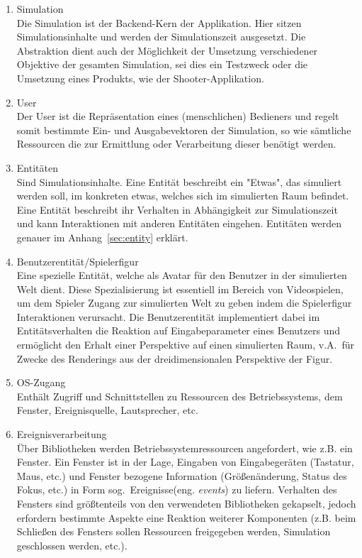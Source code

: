 \documentclass[11pt,twoside,a4paper]{article}
\begin{document}
\begin{enumerate}
\item Simulation\\
Die Simulation ist der Backend-Kern der Applikation. Hier sitzen Simulationsinhalte und werden der Simulationszeit ausgesetzt. Die Abstraktion dient auch der Möglichkeit der Umsetzung verschiedener Objektive der gesamten Simulation, sei dies ein Testzweck oder die Umsetzung eines Produkts, wie der Shooter-Applikation.
\item User\\
Der User ist die Repräsentation eines (menschlichen) Bedieners und regelt somit bestimmte Ein- und Ausgabevektoren der Simulation, so wie sämtliche Ressourcen die zur Ermittlung oder Verarbeitung dieser benötigt werden.
\item Entitäten\\
Sind Simulationsinhalte. Eine Entität beschreibt ein "Etwas", das simuliert werden soll, im konkreten etwas, welches sich im simulierten Raum befindet. Eine Entität beschreibt ihr Verhalten in Abhängigkeit zur Simulationszeit und kann Interaktionen mit anderen Entitäten eingehen. Entitäten werden genauer im Anhang~\ref{sec:entity} erklärt.
\item Benutzerentität/Spielerfigur\\
Eine spezielle Entität, welche als Avatar für den Benutzer in der simulierten Welt dient. Diese Spezialisierung ist essentiell im Bereich von Videospielen, um dem Spieler Zugang zur simulierten Welt zu geben indem die Spielerfigur Interaktionen verursacht. Die Benutzerentität implementiert dabei im Entitätsverhalten die Reaktion auf Eingabeparameter eines Benutzers und ermöglicht den Erhalt einer Perspektive auf einen simulierten Raum, v.A.~für Zwecke des Renderings aus der dreidimensionalen Perspektive der Figur.
\item OS-Zugang\\
Enthält Zugriff und Schnittstellen zu Ressourcen des Betriebssystems, dem Fenster, Ereignisquelle, Lautsprecher, etc.
\item Ereignisverarbeitung\\
Über Bibliotheken werden Betriebssystemressourcen angefordert, wie z.B. ein Fenster. Ein Fenster ist in der Lage, Eingaben von Eingabegeräten (Tastatur, Maus, etc.) und Fenster bezogene Information (Größenänderung, Status des Fokus, etc.) in Form sog.~Ereignisse(eng. \textit{events}) zu liefern. Verhalten des Fensters sind größtenteils von den verwendeten Bibliotheken gekapselt, jedoch erfordern bestimmte Aspekte eine Reaktion weiterer Komponenten (z.B. beim Schließen des Fensters sollen Ressourcen freigegeben werden, Simulation geschlossen werden, etc.).

\end{enumerate}
\end{document}
